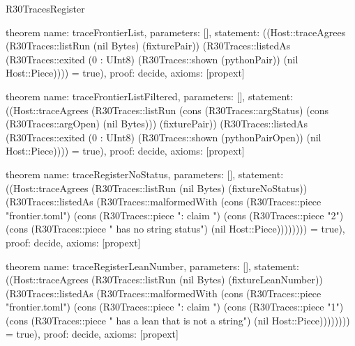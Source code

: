 \begin{lexlean}{R30TracesRegister}
\begin{semanticmodule}
theorem{
  name: traceFrontierList,
  parameters: [],
  statement: ((Host::traceAgrees (R30Traces::listRun (nil Bytes) (fixturePair)) (R30Traces::listedAs (R30Traces::exited (0 : UInt8) (R30Traces::shown (pythonPair)) (nil Host::Piece)))) = true),
  proof: decide{},
  axioms: [propext]
}

theorem{
  name: traceFrontierListFiltered,
  parameters: [],
  statement: ((Host::traceAgrees (R30Traces::listRun (cons (R30Traces::argStatus) (cons (R30Traces::argOpen) (nil Bytes))) (fixturePair)) (R30Traces::listedAs (R30Traces::exited (0 : UInt8) (R30Traces::shown (pythonPairOpen)) (nil Host::Piece)))) = true),
  proof: decide{},
  axioms: [propext]
}

theorem{
  name: traceRegisterNoStatus,
  parameters: [],
  statement: ((Host::traceAgrees (R30Traces::listRun (nil Bytes) (fixtureNoStatus)) (R30Traces::listedAs (R30Traces::malformedWith (cons (R30Traces::piece "frontier.toml") (cons (R30Traces::piece ": claim ") (cons (R30Traces::piece "2") (cons (R30Traces::piece " has no string status") (nil Host::Piece)))))))) = true),
  proof: decide{},
  axioms: [propext]
}

theorem{
  name: traceRegisterLeanNumber,
  parameters: [],
  statement: ((Host::traceAgrees (R30Traces::listRun (nil Bytes) (fixtureLeanNumber)) (R30Traces::listedAs (R30Traces::malformedWith (cons (R30Traces::piece "frontier.toml") (cons (R30Traces::piece ": claim ") (cons (R30Traces::piece "1") (cons (R30Traces::piece " has a lean that is not a string") (nil Host::Piece)))))))) = true),
  proof: decide{},
  axioms: [propext]
}
\end{semanticmodule}
\end{lexlean}
